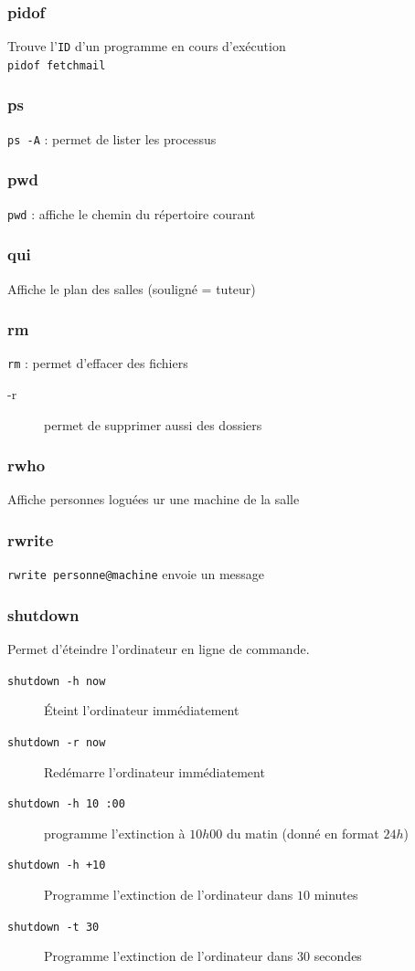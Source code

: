 \documentclass[a4paper,twoside]{article}
\begin{document}
\subsubsection{pidof}
Trouve l'\texttt{ID} d'un programme en cours d'exécution\\
\verb|pidof fetchmail|

\subsubsection{ps}
\verb|ps -A| : permet de lister les processus

\subsubsection{pwd}
\verb|pwd| : affiche le chemin du répertoire courant

\subsubsection{qui}
Affiche le plan des salles (souligné = tuteur)

\subsubsection{rm}
\verb|rm| : permet d'effacer des fichiers
\begin{description}
 \item[-r] permet de supprimer aussi des dossiers
\end{description}

\subsubsection{rwho}
Affiche personnes loguées ur une machine de la salle

\subsubsection{rwrite}
\verb|rwrite personne@machine| envoie un message

\subsubsection{shutdown}
Permet d'éteindre l'ordinateur en ligne de commande.
\begin{description}
\item[\texttt{shutdown -h now}] \'Eteint l'ordinateur immédiatement
\item[\texttt{shutdown -r now}] Redémarre l'ordinateur immédiatement
\item[\texttt{shutdown -h 10 :00}] programme l'extinction à $10h00$ du matin (donné en format $24h$)
\item[\texttt{shutdown -h +10}] Programme l'extinction de l'ordinateur dans $10$ minutes
\item[\texttt{shutdown -t 30}]Programme l'extinction de l'ordinateur dans $30$ secondes

\end{description}
\end{document}
